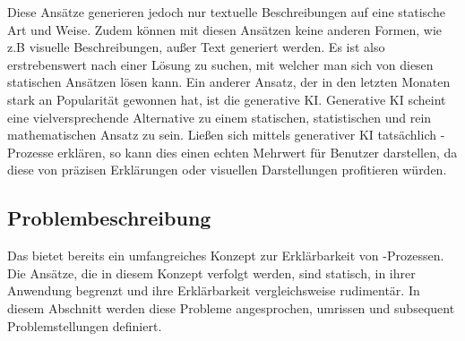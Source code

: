Diese Ansätze generieren jedoch nur textuelle Beschreibungen auf eine statische Art und Weise.
Zudem können mit diesen Ansätzen keine anderen Formen, wie z.B visuelle Beschreibungen, außer Text generiert werden.
\newline
Es ist also erstrebenswert nach einer Lösung zu suchen, mit welcher man sich von diesen statischen Ansätzen lösen kann.
Ein anderer Ansatz, der in den letzten Monaten stark an Popularität gewonnen hat, ist die generative KI.
Generative KI scheint eine vielversprechende Alternative zu einem statischen, statistischen und rein mathematischen Ansatz zu sein. 
\newline
Ließen sich mittels generativer KI tatsächlich \mmir{}-Prozesse erklären, so kann dies einen echten Mehrwert für Benutzer darstellen, da diese von präzisen Erklärungen oder visuellen Darstellungen profitieren würden.

\FloatBarrier

\subsection{Problembeschreibung}
\label{sec1:intro:subsec:problems}
Das \gmaf{} bietet bereits ein umfangreiches Konzept zur Erklärbarkeit von \mmir{}-Prozessen. 
Die Ansätze, die in diesem Konzept verfolgt werden, sind statisch, in ihrer Anwendung begrenzt und ihre Erklärbarkeit vergleichsweise rudimentär. 
In diesem Abschnitt werden diese Probleme angesprochen, umrissen und subsequent Problemstellungen definiert.

